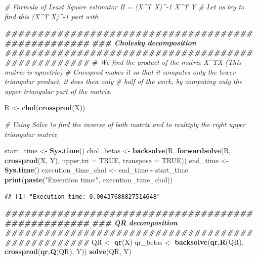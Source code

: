 \documentclass[
]{article}
\newenvironment{Shaded}{\begin{snugshade}}{\end{snugshade}}
\newcommand{\AttributeTok}[1]{\textcolor[rgb]{0.13,0.29,0.53}{#1}}
\newcommand{\CommentTok}[1]{\textcolor[rgb]{0.56,0.35,0.01}{\textit{#1}}}
\newcommand{\ConstantTok}[1]{\textcolor[rgb]{0.56,0.35,0.01}{#1}}
\newcommand{\DocumentationTok}[1]{\textcolor[rgb]{0.56,0.35,0.01}{\textbf{\textit{#1}}}}
\newcommand{\FunctionTok}[1]{\textcolor[rgb]{0.13,0.29,0.53}{\textbf{#1}}}
\newcommand{\NormalTok}[1]{#1}
\newcommand{\OtherTok}[1]{\textcolor[rgb]{0.56,0.35,0.01}{#1}}
\newcommand{\SpecialCharTok}[1]{\textcolor[rgb]{0.81,0.36,0.00}{\textbf{#1}}}
\newcommand{\StringTok}[1]{\textcolor[rgb]{0.31,0.60,0.02}{#1}}
\begin{document}
\begin{Shaded}
\begin{Highlighting}[]
\CommentTok{\# Formula of Least Square estimator B = (X\^{}T X)\^{}{-}1 X\^{}T Y}
\CommentTok{\# Let us try to find this (X\^{}T X)\^{}{-}1 part with }

\DocumentationTok{\#\#\#\#\#\#\#\#\#\#\#\#\#\#\#\#\#\#\#\#\#\#\#\#\#\#\#\#\#\#\#\#\#\#\#\#\#\#\#\#\#\#\#\#\#\#\#\#\#\#\#}
\DocumentationTok{\#\#\# Cholesky decomposition}
\DocumentationTok{\#\#\#\#\#\#\#\#\#\#\#\#\#\#\#\#\#\#\#\#\#\#\#\#\#\#\#\#\#\#\#\#\#\#\#\#\#\#\#\#\#\#\#\#\#\#\#\#\#\#\#}
\CommentTok{\# We find the product of the matrix X\^{}TX (This matrix is symetric)}
\CommentTok{\# Crossprod makes it so that it computes only the lower triangular product, it does then only }
\CommentTok{\# half of the work, by computing only the upper triangular part of the matrix.}


\NormalTok{R }\OtherTok{\textless{}{-}} \FunctionTok{chol}\NormalTok{(}\FunctionTok{crossprod}\NormalTok{(X))}

\CommentTok{\# Using Solve to find the inverse of both matrix and to multiply the right upper triangular matrix}

\NormalTok{start\_time }\OtherTok{\textless{}{-}} \FunctionTok{Sys.time}\NormalTok{()}
\NormalTok{chol\_betas }\OtherTok{\textless{}{-}} \FunctionTok{backsolve}\NormalTok{(R, }\FunctionTok{forwardsolve}\NormalTok{(R, }\FunctionTok{crossprod}\NormalTok{(X, Y), }\AttributeTok{upper.tri =} \ConstantTok{TRUE}\NormalTok{, }\AttributeTok{transpose =} \ConstantTok{TRUE}\NormalTok{))}
\NormalTok{end\_time }\OtherTok{\textless{}{-}} \FunctionTok{Sys.time}\NormalTok{()}
\NormalTok{execution\_time\_chol }\OtherTok{\textless{}{-}}\NormalTok{ end\_time }\SpecialCharTok{{-}}\NormalTok{ start\_time}
\FunctionTok{print}\NormalTok{(}\FunctionTok{paste}\NormalTok{(}\StringTok{"Execution time:"}\NormalTok{, execution\_time\_chol))}
\end{Highlighting}
\end{Shaded}

\begin{verbatim}
## [1] "Execution time: 0.00437688827514648"
\end{verbatim}

\begin{Shaded}
\begin{Highlighting}[]
\DocumentationTok{\#\#\#\#\#\#\#\#\#\#\#\#\#\#\#\#\#\#\#\#\#\#\#\#\#\#\#\#\#\#\#\#\#\#\#\#\#\#\#\#\#\#\#\#\#\#\#\#\#\#\#}
\DocumentationTok{\#\#\# QR decomposition}
\DocumentationTok{\#\#\#\#\#\#\#\#\#\#\#\#\#\#\#\#\#\#\#\#\#\#\#\#\#\#\#\#\#\#\#\#\#\#\#\#\#\#\#\#\#\#\#\#\#\#\#\#\#\#\#}
\NormalTok{QR }\OtherTok{\textless{}{-}} \FunctionTok{qr}\NormalTok{(X)}
\NormalTok{qr\_betas }\OtherTok{\textless{}{-}} \FunctionTok{backsolve}\NormalTok{(}\FunctionTok{qr.R}\NormalTok{(QR), }\FunctionTok{crossprod}\NormalTok{(}\FunctionTok{qr.Q}\NormalTok{(QR), Y))}
\FunctionTok{solve}\NormalTok{(QR, Y)}
\end{Highlighting}
\end{Shaded}
\end{document}
